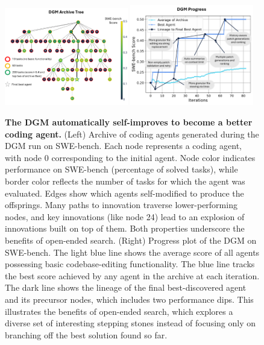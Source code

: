 \documentclass{article}
\begin{document}
\begin{figure}[ht]
    \centering
    \includegraphics[width=0.48\textwidth]{figures/dgm_archive.pdf}
    \includegraphics[width=0.48\textwidth]{figures/dgm_progress.pdf}
    \caption{\textbf{The DGM automatically self-improves to become a better coding agent.} (Left) Archive of coding agents generated during the DGM run on SWE-bench. Each node represents a coding agent, with node 0 corresponding to the initial agent. Node color indicates performance on SWE-bench (percentage of solved tasks), while border color reflects the number of tasks for which the agent was evaluated. Edges show which agents self-modified to produce the offsprings. Many paths to innovation traverse lower-performing nodes, and key innovations (like node 24) lead to an explosion of innovations built on top of them. Both properties underscore the benefits of open-ended search. (Right) Progress plot of the DGM on SWE-bench. The light blue line shows the average score of all agents possessing basic codebase-editing functionality. The blue line tracks the best score achieved by any agent in the archive at each iteration. The dark line shows the lineage of the final best-discovered agent and its precursor nodes, which includes two performance dips. This illustrates the benefits of open-ended search, which explores a diverse set of interesting stepping stones instead of focusing only on branching off the best solution found so far.}
    \label{fig:dgm-archive}
    \label{fig:dgm-progress}
    \vspace{-5mm}
\end{figure}
\end{document}
